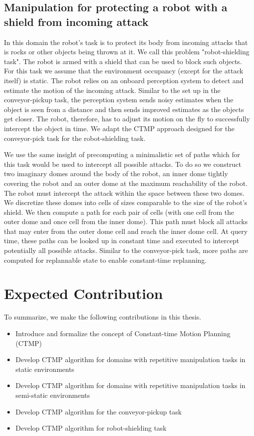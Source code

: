 \documentclass[a4paper]{report}
\begin{document}
\subsection{Manipulation for protecting a robot with a shield from incoming attack}
In this domain the robot's task is to protect its body from incoming attacks that is rocks or other objects being thrown at it. We call this problem "robot-shielding task". The robot is armed with a shield that can be used to block such objects. For this task we assume that the environment occupancy (except for the attack itself) is static.
The robot relies on an onboard perception system to detect and estimate the motion of the incoming attack. Similar to the set up in the conveyor-pickup task, the perception system sends noisy estimates when the object is seen from a distance and then sends improved estimates as the objects get closer. The robot, therefore, has to adjust its motion on the fly to successfully intercept the object in time. We adapt the CTMP approach designed for the conveyor-pick task for the robot-shielding task.

We use the same insight of precomputing a minimalistic set of paths which for this task would be used to intercept all possible attacks. To do so we construct two imaginary domes around the body of the robot, an inner dome tightly covering the robot and an outer dome at the maximum reachability of the robot. The robot must intercept the attack within the space between these two domes.
We discretize these domes into cells of sizes comparable to the size of the robot's shield. We then compute a path for each pair of cells (with one cell from the outer dome and once cell from the inner dome). This path must block all attacks that may enter from the outer dome cell and reach the inner dome cell. At query time, these paths can be looked up in constant time and executed to intercept potentially all possible attacks.
Similar to the conveyor-pick task, more paths are computed for replannable state to enable constant-time replanning.


\section{Expected Contribution}
To summarize, we make the following contributions in this thesis.
\begin{itemize}
	\item Introduce and formalize the concept of Constant-time Motion Planning (CTMP)
	\item Develop CTMP algorithm for domains with repetitive manipulation tasks in static environments
	\item Develop CTMP algorithm for domains with repetitive manipulation tasks in semi-static environments
	\item Develop CTMP algorithm for the conveyor-pickup task
	\item Develop CTMP algorithm for robot-shielding task
\end{itemize}
\end{document}
